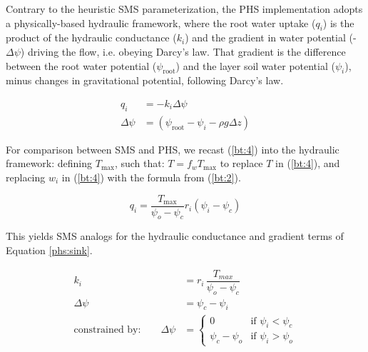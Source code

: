 \documentclass[draft,linenumbers]{agujournal}
\begin{document}
    Contrary to the heuristic SMS parameterization, the PHS implementation adopts a physically-based hydraulic framework, where the root water uptake ($q_i$) is the product of the hydraulic conductance ($k_i$) and the gradient in water potential (-$\Delta\psi$) driving the flow, i.e. obeying Darcy's law. That gradient is the difference between the root water potential ($\psi_{\text{root}}$) and the layer soil water potential ($\psi_i$), minus changes in gravitational potential, following Darcy's law.
    
    \begin{linenomath*}
    \begin{equation}
        \begin{aligned}
    q_i &= -k_i \Delta\psi \\
    \Delta\psi &= \left(\psi_{\text{root}}-\psi_{i}-\rho g \Delta z\right)
    \label{phs:sink}
    \end{aligned}
    \end{equation}
    \end{linenomath*}
    
    For comparison between SMS and PHS, we recast (\ref{bt:4}) into the hydraulic framework: defining $T_{\text{max}}$, such that: $T = f_w T_{\text{max}}$ to replace $T$ in (\ref{bt:4}), and replacing $w_i$ in (\ref{bt:4}) with the formula from (\ref{bt:2}).
    
    \begin{linenomath*}
    \begin{equation}
    \label{eq:btrwu}
    q_i = \dfrac{T_{\text{max}}}{\psi_{o}-\psi_{c}} r_i \left(\psi_i-\psi_{c} \right)
    \end{equation}
    \end{linenomath*}
    
    This yields SMS analogs for the hydraulic conductance and gradient terms of Equation \ref{phs:sink}.
    \begin{linenomath*}
    \begin{equation} \begin{aligned}
    k_i &= r_i \, \dfrac{T_{max}}{\psi_{o}-\psi_{c}} \\
    \Delta\psi &=  \psi_{c}-\psi_i \\
    \mbox{constrained by:} \qquad
    \Delta\psi &=
    \begin{cases}
    0                          & \text{if } \psi_i<\psi_{c}  \\
    \psi_{c}-\psi_{o} & \text{if } \psi_i>\psi_{o}
    \label{kb}
    \end{cases}
    \end{aligned}\end{equation}
    \end{linenomath*}
\end{document}
